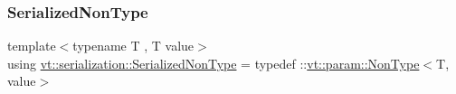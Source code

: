 \mbox{\label{namespacevt_1_1serialization_a834e21f3294a160fc6545a1bfc3044af}} 
\subsubsection{\texorpdfstring{Serialized\+Non\+Type}{SerializedNonType}}
{\footnotesize\ttfamily template$<$typename T , T value$>$ \\
using \hyperlink{namespacevt_1_1serialization_a834e21f3294a160fc6545a1bfc3044af}{vt\+::serialization\+::\+Serialized\+Non\+Type} = typedef \+::\hyperlink{structvt_1_1param_1_1_non_type}{vt\+::param\+::\+Non\+Type}$<$T, value$>$}

